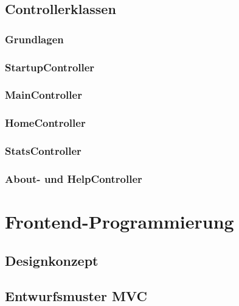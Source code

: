 \subsection{Controllerklassen}
\subsubsection{Grundlagen}
\subsubsection{StartupController}
\subsubsection{MainController}
\subsubsection{HomeController}
\subsubsection{StatsController}
\subsubsection{About- und HelpController}


\section{Frontend-Programmierung}
\subsection{Designkonzept}
\subsection{Entwurfsmuster MVC}
